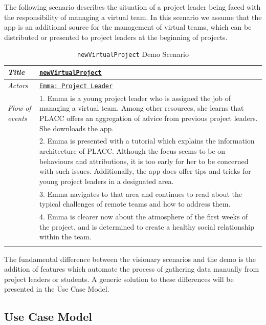 The following scenario describes the situation of a project leader being faced with the responsibility of managing a virtual team.  In this scenario we assume that the app is an additional source for the management of virtual teams, which can be distributed or presented to project leaders at the beginning of projects. 

\begin{longtable}[ht]{ p{}  p{} }
\caption{\texttt{newVirtualProject} Demo Scenario}
\label{tab:newVirtualProject}\\
\hline
\textit{Title} & \underline{\texttt{newVirtualProject}} \\ [1.2ex]
    \hline
   \textit{Actors} & \underline{\texttt{Emma: Project Leader}} \\ [1.2ex]
   \hline
   \textit{Flow of events} &  1. Emma is a young project leader who is assigned the job of managing a virtual team.  Among other resources, she learns that PLACC offers an aggregation of advice from previous project leaders.  She downloads the app. \\
   & 2.  Emma is presented with a tutorial which explains the information architecture of PLACC.  Although the focus seems to be on behaviours and attributions, it is too early for her to be concerned with such issues.  Additionally, the app does offer tips and tricks for young project leaders in a designated area. \\
   & 3. Emma navigates to that area and continues to read about the typical challenges  of remote teams and how to address them.\\
   & 4. Emma is clearer now about the atmosphere of the first weeks of the project, and is determined to create a healthy social relationship within the team. \\
   \hline
\label{tab:multicol}
\end{longtable}

The fundamental difference between the visionary scenarios and the demo is the addition of features which automate the process of gathering data manually from project leaders or students. A generic solution to these differences will be presented in the Use Case Model.

\subsection{Use Case Model}



